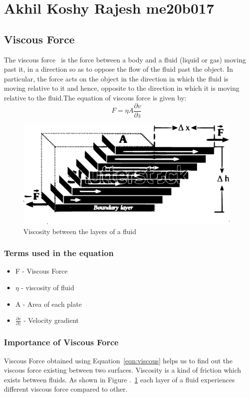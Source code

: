 \section{Akhil Koshy Rajesh me20b017}
\subsection{Viscous Force}

The viscous force~\cite{refer} is the force between a body and a fluid (liquid or gas) 
moving past it, in a direction so as to oppose the flow of the fluid past 
the object. In particular, the force acts on the object in the direction in 
which the fluid is moving relative to it and hence, opposite to the 
direction in which it is moving relative to the fluid.The equation of 
viscous force is given by: 
\begin{equation}
F = \eta A \frac{\partial v}{\partial z}
\label{eqn:viscous}
\end{equation}
\begin{figure}[h]
	\begin{center}
		  \includegraphics[scale=0.6]{me20b017.eps}
	\end{center}
\caption{Viscosity between the layers of a fluid}
\label{fig:viscous}
\end{figure}

\subsubsection{Terms used in the equation}
\begin{itemize}
	\item F - Viscous Force
	\item $\eta$ - viscosity of fluid
	\item A - Area of each plate
	\item $\frac{\partial v}{\partial z}$ - Velocity gradient 
\end{itemize}

\subsubsection{Importance of Viscous Force}
Viscous Force obtained using Equation~\ref{eqn:viscous} helps us to find 
out the viscous force existing between two surfaces. Viscosity is a kind 
of friction which exists between fluids. As shown in Figure .~\ref{fig:viscous}
each layer of a fluid experiences different viscous force compared to 
other.

